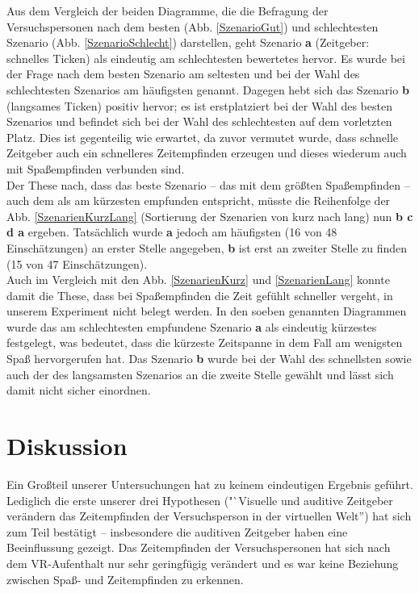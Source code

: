 \documentclass{Paper}
\begin{document}
Aus dem Vergleich der beiden Diagramme, die die Befragung der Versuchspersonen nach dem besten (Abb. \ref{SzenarioGut}) und schlechtesten Szenario (Abb. \ref{SzenarioSchlecht}) darstellen, geht Szenario \textbf{a} (Zeitgeber: schnelles Ticken) als eindeutig am schlechtesten bewertetes hervor. Es wurde bei der Frage nach dem besten Szenario am seltesten und bei der Wahl des schlechtesten Szenarios am häufigsten genannt. Dagegen hebt sich das Szenario \textbf{b} (langsames Ticken) positiv hervor; es ist erstplatziert bei der Wahl des besten Szenarios und befindet sich bei der Wahl des schlechtesten auf dem vorletzten Platz. Dies ist gegenteilig wie erwartet, da zuvor vermutet wurde, dass schnelle Zeitgeber auch ein schnelleres Zeitempfinden erzeugen und dieses wiederum auch mit Spaßempfinden verbunden sind.\\
Der These nach, dass das beste Szenario -- das mit dem größten Spaßempfinden -- auch dem als am kürzesten empfunden entspricht, müsste die Reihenfolge der Abb. \ref{SzenarienKurzLang} (Sortierung der Szenarien von kurz nach lang) nun \textbf{b c d a} ergeben. Tatsächlich wurde \textbf{a} jedoch am häufigsten (16 von 48 Einschätzungen) an erster Stelle angegeben, \textbf{b} ist erst an zweiter Stelle zu finden (15 von 47 Einschätzungen).\\
Auch im Vergleich mit den Abb. \ref{SzenarienKurz} und \ref{SzenarienLang} konnte damit die These, dass bei Spaßempfinden die Zeit gefühlt schneller vergeht, in unserem Experiment nicht belegt werden. In den soeben genannten Diagrammen wurde das am schlechtesten empfundene Szenario \textbf{a} als eindeutig kürzestes festgelegt, was bedeutet, dass die kürzeste Zeitspanne in dem Fall am wenigsten Spaß hervorgerufen hat. Das Szenario \textbf{b} wurde bei der Wahl des schnellsten sowie auch der des langsamsten Szenarios an die zweite Stelle gewählt und lässt sich damit nicht sicher einordnen.\\


\section{Diskussion}

Ein Großteil unserer Untersuchungen hat zu keinem eindeutigen Ergebnis geführt. Lediglich die erste unserer drei Hypothesen ("`Visuelle und auditive Zeitgeber verändern das Zeitempfinden der Versuchsperson in der virtuellen Welt'') hat sich zum Teil bestätigt -- insbesondere die auditiven Zeitgeber haben eine Beeinflussung gezeigt. Das Zeitempfinden der Versuchspersonen hat sich nach dem VR-Aufenthalt nur sehr geringfügig verändert und es war keine Beziehung zwischen Spaß- und Zeitempfinden zu erkennen.
 
\end{document}
